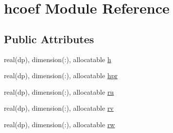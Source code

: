 \hypertarget{classhcoef}{\section{hcoef Module Reference}
\label{classhcoef}
}
\subsection*{Public Attributes}
\begin{DoxyCompactItemize}
\item 
real(dp), dimension(\-:), allocatable \hyperlink{classhcoef_a0fe90253d788ab22a12015d18132d8bf}{h}
\item 
real(dp), dimension(\-:), allocatable \hyperlink{classhcoef_aac65983f64ce20a3ddb35933d35cb78b}{hpr}
\item 
real(dp), dimension(\-:), allocatable \hyperlink{classhcoef_abff8e220ad240114fdb4775dcf026ca1}{ru}
\item 
real(dp), dimension(\-:), allocatable \hyperlink{classhcoef_a817f137e681d7382d4ac542179b85cb2}{rv}
\item 
real(dp), dimension(\-:), allocatable \hyperlink{classhcoef_a10cd6a89a20929137ddb8a7a9d29ba2d}{rw}
\end{DoxyCompactItemize}


